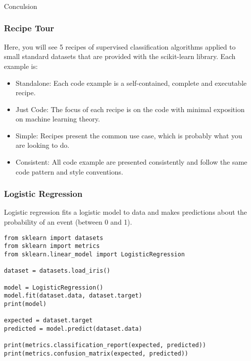 \begin{frame}[fragile]\frametitle{}
\begin{center}
{\Large Conculsion}
\end{center}
\end{frame}



\begin{frame}[fragile]\frametitle{Recipe Tour}
Here, you will see 5 recipes of supervised classification algorithms applied to small standard datasets that are provided with the scikit-learn library. Each example is:
\begin{itemize}
\item Standalone: Each code example is a self-contained, complete and executable recipe.
\item Just Code: The focus of each recipe is on the code with minimal exposition on machine learning theory.
\item Simple: Recipes present the common use case, which is probably what you are looking to do.
\item Consistent: All code example are presented consistently and follow the same code pattern and style conventions.
\end{itemize}
\end{frame}

\begin{frame}[fragile]\frametitle{Logistic Regression}
Logistic regression fits a logistic model to data and makes predictions about the probability of an event (between 0 and 1). 
\begin{lstlisting}
from sklearn import datasets
from sklearn import metrics
from sklearn.linear_model import LogisticRegression

dataset = datasets.load_iris()

model = LogisticRegression()
model.fit(dataset.data, dataset.target)
print(model)

expected = dataset.target
predicted = model.predict(dataset.data)

print(metrics.classification_report(expected, predicted))
print(metrics.confusion_matrix(expected, predicted))
\end{lstlisting}
\end{frame}

